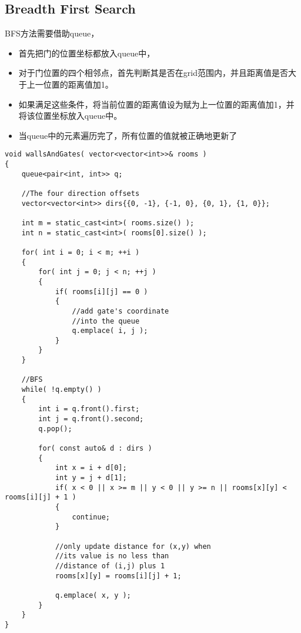 \subsection{Breadth First Search}
BFS方法需要借助queue，
\begin{itemize}
\item 首先把门的位置坐标都放入queue中，
\item 对于门位置的四个相邻点，首先判断其是否在grid范围内，并且距离值是否大于上一位置的距离值加1。
\item 如果满足这些条件，将当前位置的距离值设为赋为上一位置的距离值加1，并将该位置坐标放入queue中。
\item 当queue中的元素遍历完了，所有位置的值就被正确地更新了
\end{itemize}
\begin{lstlisting}[style=customc, caption={BFS}]
void wallsAndGates( vector<vector<int>>& rooms )
{
    queue<pair<int, int>> q;

    //The four direction offsets
    vector<vector<int>> dirs{{0, -1}, {-1, 0}, {0, 1}, {1, 0}};

    int m = static_cast<int>( rooms.size() );
    int n = static_cast<int>( rooms[0].size() );

    for( int i = 0; i < m; ++i )
    {
        for( int j = 0; j < n; ++j )
        {
            if( rooms[i][j] == 0 )
            {
                //add gate's coordinate
                //into the queue
                q.emplace( i, j );
            }
        }
    }

    //BFS
    while( !q.empty() )
    {
        int i = q.front().first;
        int j = q.front().second;
        q.pop();

        for( const auto& d : dirs )
        {
            int x = i + d[0];
            int y = j + d[1];
            if( x < 0 || x >= m || y < 0 || y >= n || rooms[x][y] < rooms[i][j] + 1 )
            {
                continue;
            }

            //only update distance for (x,y) when
            //its value is no less than
            //distance of (i,j) plus 1
            rooms[x][y] = rooms[i][j] + 1;

            q.emplace( x, y );
        }
    }
}
\end{lstlisting}

